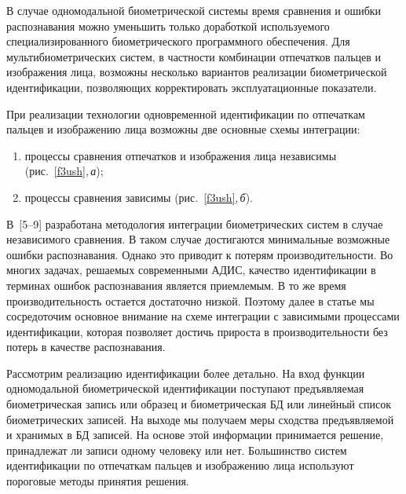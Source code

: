 \begin{multicols}{2}
     В случае одномодальной биометрической сис\-те\-мы время сравнения и ошибки
распознавания можно уменьшить только доработкой ис\-поль\-зу\-емо\-го
специализированного биометрического программного обеспечения. Для
мультибиометрических систем, в частности комбинации отпечатков пальцев и
изображения лица, возможны несколько вариантов реализации биометрической
идентификации, позволяющих корректировать эксплуатационные показатели.

     При реализации технологии одновременной идентификации по отпечаткам
пальцев и изображению лица возможны две основные схемы интеграции:
     \begin{enumerate}[(1)]
\item процессы сравнения отпечатков и изображения лица независимы
(рис.~\ref{f3ush},\,\textit{а});
\item процессы сравнения зависимы (рис.~\ref{f3ush},\,\textit{б}).
\end{enumerate}

     В~[5--9] разработана методология интеграции биометрических систем в случае
независимого сравнения. В таком случае достигаются минимальные возможные
ошибки распознавания. Однако это приводит к потерям про\-из\-во\-ди\-тель\-ности. Во
многих задачах, решаемых современными АДИС, качество идентификации в терминах
ошибок распознавания является приемлемым. В то же время производительность
остается достаточно низкой. Поэтому далее в статье мы сосредоточим
основное внимание на схеме интеграции с зависимыми процессами идентификации,
которая позволяет достичь прироста в производительности без потерь в качестве
распознавания.

     Рассмотрим реализацию идентификации более детально. На вход функции
одномодальной био\-мет\-ри\-че\-ской идентификации поступают предъ\-явля\-емая
биометрическая запись или образец и био\-мет\-ри\-че\-ская БД или линейный
список био\-мет\-ри\-че\-ских записей. На выходе мы получаем меры сходства
предъявляемой и хранимых в БД записей. На основе этой информации принимается
решение, принадлежат ли записи одному человеку или нет. Большинство систем
идентификации по отпечаткам пальцев и изображению лица используют пороговые
методы принятия решения.

\end{multicols}

     \begin{figure*} %
\vspace*{1pt}
\begin{center}
\mbox{%
\epsfxsize=135.116mm
}
\end{center}
\vspace*{-9pt}
      \end{figure*}

